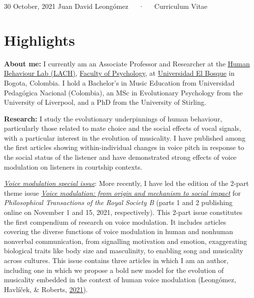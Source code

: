 \documentclass[11pt, a4paper]{awesome-cv}
\begin{document}
\makecvheader

\makecvfooter
  {30 October, 2021}
    {Juan David Leongómez~~~·~~~Curriculum Vitae}
  {\thepage}





\hypertarget{highlights}{%
\section{Highlights}\label{highlights}}

\textbf{About me:} I currently am an Associate Professor and Researcher
at the \href{https://www.psicologia.unbosque.edu.co/lach}{Human
Behaviour Lab (LACH)},
\href{https://www.uelbosque.edu.co/psicologia}{Faculty of Psychology},
at \href{https://www.uelbosque.edu.co/}{Universidad El Bosque} in
Bogota, Colombia. I hold a Bachelor's in Music Education from
Universidad Pedagógica Nacional (Colombia), an MSc in Evolutionary
Psychology from the University of Liverpool, and a PhD from the
University of Stirling.

\textbf{Research:} I study the evolutionary underpinnings of human
behaviour, particularly those related to mate choice and the social
effects of vocal signals, with a particular interest in the evolution of
musicality. I have published among the first articles showing
within-individual changes in voice pitch in response to the social
status of the listener and have demonstrated strong effects of voice
modulation on listeners in courtship contexts.

\underline{\textit{Voice modulation special issue}}: More recently, I
have led the edition of the 2-part theme issue
\href{https://jdleongomez.info/en/files/TB1840-1841_voice_modulation.pdf}{\textit{Voice modulation: from origin and mechanism to social impact}}
for \emph{Philosophical Transactions of the Royal Society B} (parts 1
and 2 publishing online on November 1 and 15, 2021, respectively). This
2-part issue constitutes the first compendium of research on voice
modulation. It includes articles covering the diverse functions of voice
modulation in human and nonhuman nonverbal communication, from
signalling motivation and emotion, exaggerating biological traits like
body size and masculinity, to enabling song and musicality across
cultures. This issue contains three articles in which I am an author,
including one in which we propose a bold new model for the evolution of
musicality embedded in the context of human voice modulation (Leongómez,
Havlíček, \& Roberts,
\href{https://jdleongomez.info/en/publication/leongomez2021musicality/}{2021}).
\end{document}
